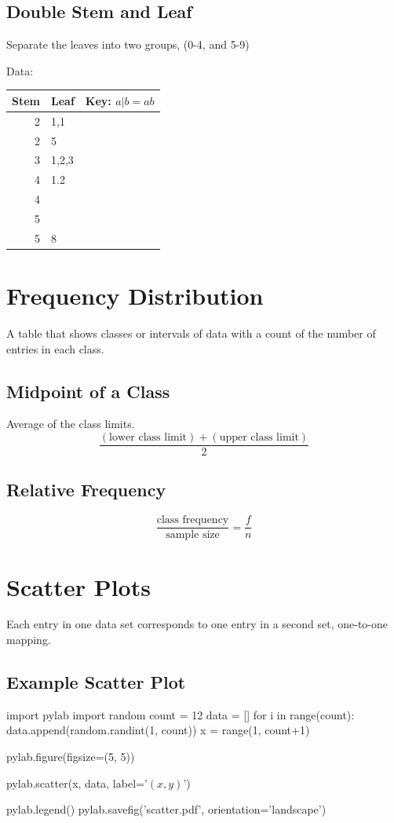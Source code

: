 \documentclass{book}
\begin{document}
\subsection{Double Stem and Leaf}

Separate the leaves into two groups, (0-4, and 5-9)

Data: \py{[31, 21, 32, 33, 41, 42, 58, 25, 21]}\\

\begin{tabular}{r|ll}
Stem & Leaf & Key: $a|b=ab$\\
\hline
2&1,1\\
2&5\\
3&1,2,3\\
4&1.2\\
4&\\
5&\\
5&8\\
\end{tabular}

\section{Frequency Distribution}
A table that shows classes or intervals of data with a count of the number of entries in each class.

\subsection{Midpoint of a Class}
Average of the class limits.
$$\frac{(\text{lower class limit})+(\text{upper class limit})}{2}$$

\subsection{Relative Frequency}
$$\frac{\text{class frequency}}{\text{sample size}}=\frac{f}{n}$$

\section{Scatter Plots}
Each entry in one data set corresponds to one entry in a second set, one-to-one mapping.

\subsection{Example Scatter Plot}

\begin{pycode}
import pylab
import random
count = 12
data = []
for i in range(count): data.append(random.randint(1, count))
x = range(1, count+1)

pylab.figure(figsize=(5, 5))

pylab.scatter(x, data, label='$(x, y)$')

pylab.legend()
pylab.savefig('scatter.pdf', orientation='landscape')
\end{pycode}
\end{document}
